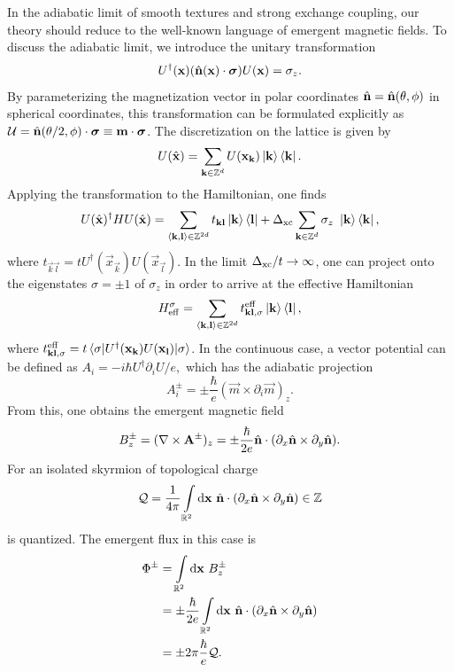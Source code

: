 \documentclass[
    10pt,
    aps,
    prb,
    twocolumn,
    floatfix,
    superscriptaddress,
]{revtex4-2}
\begin{document}
In the adiabatic limit of smooth textures and strong exchange coupling, our theory should reduce to the well-known language of emergent magnetic fields.
To discuss the adiabatic limit, we introduce the unitary transformation
\begin{equation}
	U^\dagger(\mathbf{x}) ( \hat{\mathbf{n}}(\mathbf{x})\cdot \boldsymbol{\sigma} ) U(\mathbf{x})  = \sigma_z .
\end{equation}
By parameterizing the magnetization vector in polar coordinates $\hat{\mathbf{n}} = \hat{\mathbf{n}}(\theta, \phi)$ in spherical coordinates, this transformation can be formulated explicitly as $\mathcal{U} = \hat{\mathbf{n}}(\theta/2, \phi)\cdot \boldsymbol{\sigma} \equiv \mathbf{m} \cdot \boldsymbol{\sigma}$.
The discretization on the lattice is given by
\begin{equation}
	U( \hat{\mathbf{x}}) = \sum_{\mathbf{k} \in \mathbb{Z}^d} U( \mathbf{x}_{\mathbf{k}} )\ket{\mathbf{k}} \bra{\mathbf{k}} .
\end{equation}
Applying the transformation to the Hamiltonian, one finds
\begin{align}
	U( \hat{\mathbf{x}})^\dagger H  U( \hat{\mathbf{x}}) = \sum_{\braket{\mathbf{k},\mathbf{l}} \in \mathbb{Z}^{2d}} t_{\mathbf{k}\mathbf{l}} \ket{\mathbf{k}}\bra{\mathbf{l}}
	+ \Delta_\mathrm{xc}\sum_{\mathbf{k} \in \mathbb{Z}^d}  \sigma_z ~ \ket{\mathbf{k}}\bra{\mathbf{k}} ,
\end{align}
where $t_{\vec{k}\vec{l}} = t U^\dagger(\vec{x}_\vec{k}) U(\vec{x}_\vec{l})$.
In the limit $\Delta_\mathrm{xc} / t \to \infty$, one can project onto the eigenstates $\sigma = \pm 1$ of $\sigma_z$ in order to arrive at the effective Hamiltonian
\begin{equation}
	H_\mathrm{eff}^\sigma
	= \sum_{\braket{\mathbf{k},\mathbf{l}} \in \mathbb{Z}^{2d}} t_{\mathbf{k}\mathbf{l}, \sigma}^{\mathrm{eff}} \ket{\mathbf{k}}\bra{\mathbf{l}},
\end{equation}
where
$
t_{\mathbf{k}\mathbf{l}, \sigma}^{\mathrm{eff}} =t  \braket{\sigma |  U^\dagger(\mathbf{x}_{\mathbf{k}}) U(\mathbf{x}_{\mathbf{l}})  | \sigma }
$.
In the continuous case, a vector potential can be defined as
$
A_i = - i \hbar U^\dagger \partial_i U  / e ,
$
which has the adiabatic projection
\begin{equation}
	A_i^{\pm} = \pm \frac{\hbar}{e} ( \vec{m} \times \partial_i \vec{m} )_z .
\end{equation}
From this, one obtains the emergent magnetic field
\begin{equation}
	B_z^\pm 
	= (\nabla \times \mathbf{A}^\pm)_z = \pm \frac{\hbar}{2 e} \hat{\mathbf{n}} \cdot (\partial_x \hat{\mathbf{n}} \times \partial_y \hat{\mathbf{n}}) .
\end{equation}
For an isolated skyrmion of topological charge 
\begin{equation}
	\mathcal{Q} = \frac{1}{4 \pi}\int\limits_{\mathbb{R}^2} \mathrm{d} \mathbf{x}~ \hat{\mathbf{n}} \cdot (\partial_x \hat{\mathbf{n}} \times \partial_y \hat{\mathbf{n}}) \in \mathbb{Z}
\end{equation}
is quantized.
The emergent flux in this case is
\begin{align}
	\Phi^\pm & = \int\limits_{\mathbb{R}^2} \mathrm{d} \mathbf{x}~ B_z^\pm 
    \notag \\
	& =\pm \frac{\hbar}{2 e} \int\limits_{\mathbb{R}^2} \mathrm{d} \mathbf{x}~ \hat{\mathbf{n}} \cdot (\partial_x \hat{\mathbf{n}} \times \partial_y \hat{\mathbf{n}})
    \notag \\
	&=\pm 2 \pi \frac{\hbar}{ e}  \mathcal{Q} .
\end{align}
\end{document}

